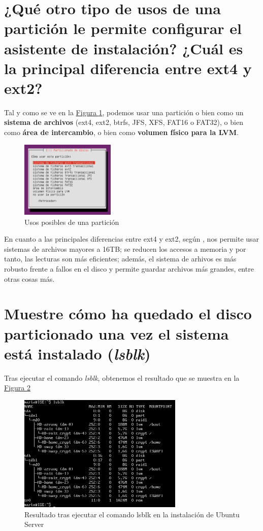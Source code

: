 \documentclass[10pt,a4paper,spanish]{article}
\numberwithin{equation}{section} %
\numberwithin{figure}{section} %
\numberwithin{table}{section} %
\begin{document}
\section{¿Qué otro tipo de usos de una partición le permite configurar el asistente de instalación? ¿Cuál es la principal diferencia entre ext4 y ext2?}
Tal y como se ve en la \hyperref[usos_p]{Figura \ref*{usos_p}}, podemos usar una partición o bien como un \textbf{sistema de archivos} (ext4, ext2, btrfs, JFS, XFS, FAT16 o FAT32), o bien como \textbf{área de intercambio}, o bien como \textbf{volumen físico para la LVM}.

\begin{figure}[!h]
\centering
\includegraphics[width=0.4\textwidth]{4}
\caption{Usos posibles de una partición}
\label{usos_p}
\end{figure}

En cuanto a las principales diferencias entre ext4 y ext2, según \cite{ext4}, nos permite usar sistemas de archivos mayores a 16TB; se reducen los accesos a memoria y por tanto, las lecturas son más eficientes; además, el sistema de arhivos es más robusto frente a fallos en el disco y permite guardar archivos más grandes, entre otras cosas más.

\section{Muestre cómo ha quedado el disco particionado una vez el sistema está instalado (\textit{lsblk})}

Tras ejecutar el comando \textit{lsblk}, obtenemos el resultado que se muestra en la \hyperref[lsblk]{Figura \ref*{lsblk}}

\begin{figure}[!h]
\centering
\includegraphics[width=0.7\textwidth]{6}
\caption{Resultado tras ejecutar el comando lsblk en la instalación de Ubuntu Server}
\label{lsblk}
\end{figure}
\end{document}
